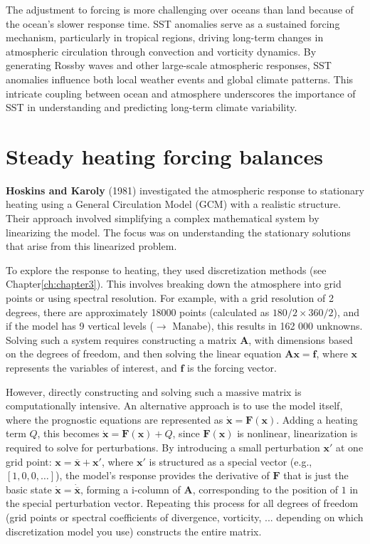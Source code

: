The adjustment to forcing is more challenging over oceans than land because of the ocean’s slower response time. SST anomalies serve as a sustained forcing mechanism, particularly in tropical regions, driving long-term changes in atmospheric circulation through convection and vorticity dynamics. By generating Rossby waves and other large-scale atmospheric responses, SST anomalies influence both local weather events and global climate patterns. This intricate coupling between ocean and atmosphere underscores the importance of SST in understanding and predicting long-term climate variability.\\[0.25 cm]

\section{Steady heating forcing balances}
\textbf{Hoskins and Karoly}\cite{B.J.Hoskins1981} (1981) investigated the atmospheric response to stationary heating using a General Circulation Model (GCM) with a realistic structure. Their approach involved simplifying a complex mathematical system by linearizing the model. The focus was on understanding the stationary solutions that arise from this linearized problem.

To explore the response to heating, they used discretization methods (see Chapter\ref{ch:chapter3}). This involves breaking down the atmosphere into grid points or using spectral resolution. For example, with a grid resolution of 2 degrees, there are approximately 18000 points (calculated as $180/2\times360/2$), and if the model has 9 vertical levels ($\rightarrow$ Manabe), this results in 162 000 unknowns. Solving such a system requires constructing a matrix $\mathbf{A}$, with dimensions based on the degrees of freedom, and then solving the linear equation $\mathbf{A}\mathbf{x}=\mathbf{f}$, where
$\mathbf{x}$ represents the variables of interest, and $\mathbf{f}$ is the forcing vector.

However, directly constructing and solving such a massive matrix is computationally intensive. An alternative approach is to use the model itself, where the prognostic equations are represented as $\mathbf{\dot{x}}=\mathbf{F(x)}$. Adding a heating term $Q$, this becomes $\mathbf{\dot{x}=F(x)}+Q$, since $\mathbf{F(x)}$ is nonlinear, linearization is required to solve for perturbations. By introducing a small perturbation $\mathbf{x'}$ at one grid point: $\mathbf{x=\overline{x}+x'}$, where $\mathbf{x'}$  is structured as a special vector (e.g., $[1,0,0,\dots]$), the model’s response provides the derivative of $\mathbf{F}$ that is just the basic state $\mathbf{\dot{x}=\dot{\overline{x}}}$, forming a i-column of $\mathbf{A}$, corresponding to the position of $1$ in the special perturbation vector. Repeating this process for all degrees of freedom (grid points or spectral coefficients of divergence, vorticity, ... depending on which discretization model you use) constructs the entire matrix.


